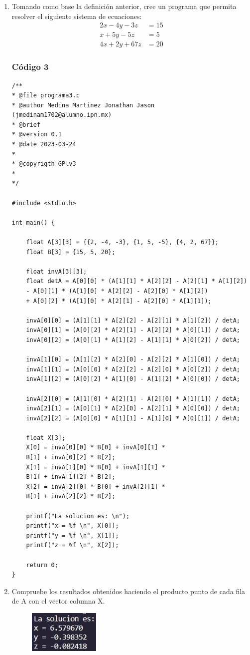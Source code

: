 \documentclass{article}
\begin{document}
\begin{enumerate}
	\item Tomando como base la definición anterior, cree un programa que permita resolver el siguiente sistema de ecuaciones:
	\begin{align*}
		2x - 4y - 3z &= 15 \\
		x + 5y - 5z &= 5 \\
		4x + 2y + 67z &= 20
	\end{align*}
\subsubsection{Código 3}
\begin{lstlisting}
/**
* @file programa3.c
* @author Medina Martinez Jonathan Jason (jmedinam1702@alumno.ipn.mx)
* @brief 
* @version 0.1
* @date 2023-03-24
* 
* @copyrigth GPlv3
* 
*/
	
#include <stdio.h>
	
int main() {
		
	float A[3][3] = {{2, -4, -3}, {1, 5, -5}, {4, 2, 67}};
	float B[3] = {15, 5, 20};
		
	float invA[3][3];
	float detA = A[0][0] * (A[1][1] * A[2][2] - A[2][1] * A[1][2])
	- A[0][1] * (A[1][0] * A[2][2] - A[2][0] * A[1][2])
	+ A[0][2] * (A[1][0] * A[2][1] - A[2][0] * A[1][1]);
		
	invA[0][0] = (A[1][1] * A[2][2] - A[2][1] * A[1][2]) / detA;
	invA[0][1] = (A[0][2] * A[2][1] - A[2][2] * A[0][1]) / detA;
	invA[0][2] = (A[0][1] * A[1][2] - A[1][1] * A[0][2]) / detA;
		
	invA[1][0] = (A[1][2] * A[2][0] - A[2][2] * A[1][0]) / detA;
	invA[1][1] = (A[0][0] * A[2][2] - A[2][0] * A[0][2]) / detA;
	invA[1][2] = (A[0][2] * A[1][0] - A[1][2] * A[0][0]) / detA;
		
	invA[2][0] = (A[1][0] * A[2][1] - A[2][0] * A[1][1]) / detA;
	invA[2][1] = (A[0][1] * A[2][0] - A[2][1] * A[0][0]) / detA;
	invA[2][2] = (A[0][0] * A[1][1] - A[1][0] * A[0][1]) / detA;
		
	float X[3];
	X[0] = invA[0][0] * B[0] + invA[0][1] *
	B[1] + invA[0][2] * B[2];
	X[1] = invA[1][0] * B[0] + invA[1][1] *
	B[1] + invA[1][2] * B[2];
	X[2] = invA[2][0] * B[0] + invA[2][1] *
	B[1] + invA[2][2] * B[2];
		
	printf("La solucion es: \n");
	printf("x = %f \n", X[0]);
	printf("y = %f \n", X[1]);
	printf("z = %f \n", X[2]);
		
	return 0;
}
\end{lstlisting}
\item Compruebe los resultados obtenidos haciendo el producto punto de cada fila de A con el vector columna X.
\begin{figure}[H]
	\centering
	\includegraphics[height = 2cm]{img3a.jpg}
\end{figure}


\end{enumerate}
\end{document}
